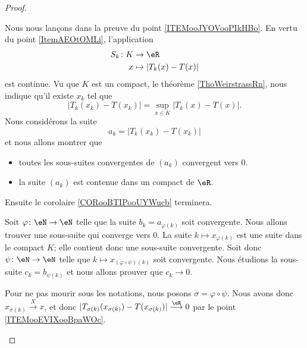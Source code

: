 \begin{proof}
\begin{subproof}
		Nous nous lançons dans la preuve du point \ref{ITEMooJYOVooPIkHBo}. En vertu du point \ref{ItemAEOtOMLi}, l'application
		\begin{equation}
			\begin{aligned}
				S_k\colon K & \to \eR                 \\
				x           & \mapsto | T_k(x)-T(x) |
			\end{aligned}
		\end{equation}
		est continue. Vu que \( K\) est un compact, le théorème \ref{ThoWeirstrassRn}, nous indique qu'il existe \( x_k\) tel que
		\begin{equation}
			| T_k(x_k)-T(x_k) |=\sup_{x\in K}| T_k(x)-T(x) |.
		\end{equation}
		Nous considérons la suite
		\begin{equation}
			a_k=| T_k(x_k)-T(x_k) |
		\end{equation}
		et nous allons montrer que
		\begin{itemize}
			\item toutes les sous-suites convergentes de \( (a_k)\) convergent vers \( 0\).
			\item la suite \( (a_k)\) est contenue dans un compact de \( \eR\).
		\end{itemize}
		Ensuite le corolaire \ref{CORooBTIPooUYWucb} terminera.
		\begin{subproof}

			Soit \( \varphi\colon \eN\to \eN\) telle que la suite \( b_k=a_{\varphi(k)}\) soit convergente. Nous allons trouver une sous-suite qui converge vers \( 0\).  La suite \( k\mapsto x_{\varphi(k)}\) est une suite dans le compact \( K\); elle contient donc une sous-suite convergente. Soit donc \( \psi\colon \eN\to \eN\) telle que \( k\mapsto x_{(\varphi\circ\psi)(k)}\) soit convergente. Nous étudions la sous-suite \( c_k=b_{\psi(k)}\) et nous allons prouver que \( c_k\to 0\).

			Pour ne pas mourir sous les notations, nous posons \( \sigma=\varphi\circ\psi\). Nous avons donc \( x_{\sigma(k)}\stackrel{X}{\longrightarrow}x\), et donc  \( | T_{\sigma(k)}(x_{\sigma(k)})-T(x_{\sigma(k)}) |\stackrel{\eR}{\longrightarrow}0\) par le point \ref{ITEMooEVIXooBpaWOc}.



\end{subproof}
\end{subproof}
\end{proof}
